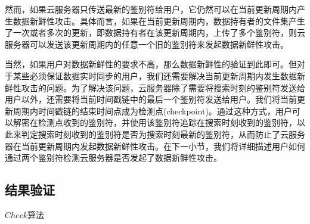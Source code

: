 然而，如果云服务器只传送最新的鉴别符给用户，它仍然可以在当前更新周期内产生数据新鲜性攻击。具体而言，如果在当前更新周期内，数据持有者的文件集产生了一次或者多次的更新，即数据持有者在该更新周期内，上传了多个鉴别符，则云服务器可以发送该更新周期内的任意一个旧的鉴别符来发起数据新鲜性攻击。

当然，如果用户对数据新鲜性的要求不高，那么数据新鲜性的验证到此即可。但对于某些必须保证数据实时同步的用户，我们还需要解决当前更新周期内发生数据新鲜性攻击的问题。为了解决该问题，云服务器除了需要将搜索时刻的鉴别符发送给用户以外，还需要将当前时间戳链中的最后一个鉴别符发送给用户。我们将当前更新周期内时间戳链的结束时间点成为检测点(checkpoint)。通过这种方式，用户可以解密在检测点收到的鉴别符，并使用该鉴别符追踪在搜索时刻收到的鉴别符，以此来判定搜索时刻收到的鉴别符是否为搜索时刻最新的鉴别符，从而防止了云服务器在当前更新周期内发起数据新鲜性攻击。在下一小节，我们将详细描述用户如何通过两个鉴别符检测云服务器是否发起了数据新鲜性攻击。


\subsection{结果验证}

\begin{algorithm}[t]
  \caption{$Check$算法}
  \label{alg:check}
  \begin{algorithmic}[1]
              \ENDIF
              \ENDIF
                    \ENDIF
              \ENDFOR
              \ELSE
              \ENDIF
  \end{algorithmic}
\end{algorithm}

